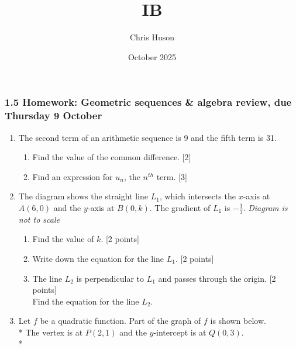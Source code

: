 \documentclass[12pt, twoside]{article}
\title{IB}
\author{Chris Huson}
\date{October 2025}
\begin{document}
\subsubsection*{1.5 Homework: Geometric sequences \& algebra review, due Thursday 9 October}
\begin{enumerate}[itemsep=0.5cm]
\item The second term of an arithmetic sequence is 9 and the fifth term is 31.
    \begin{enumerate}[itemsep=0.25cm]
        \item Find the value of the common difference. \hfill [2]
        \item Find an expression for $u_n$, the $n^{th}$ term.  \hfill [3]
    \end{enumerate}
    
\newpage
  \item The diagram shows the straight line $L_1$, which intersects the $x$-axis at $A(6, 0)$ and the $y$-axis at $B(0,k)$. The gradient of $L_1$ is $-\frac{1}{3}$. \hfill \emph{Diagram is not to scale}
        \begin{center}
        \end{center}
        \begin{enumerate}%
            \item Find the value of $k$. \hfill [2 points]
            \item Write down the equation for the line $L_1$. \hfill [2 points]
            \item The line $L_2$ is perpendicular to $L_1$ and passes through the origin. \hfill [2 points]\\[0.2cm]
            Find the equation for the line $L_2$.
        \end{enumerate}
\newpage
\newpage
  \item Let $f$ be a quadratic function. Part of the graph of $f$ is shown below.\\*
  The vertex is at $P(2,1)$ and the $y$-intercept is at $Q(0, 3)$.\\*


\end{enumerate}
\end{document}
